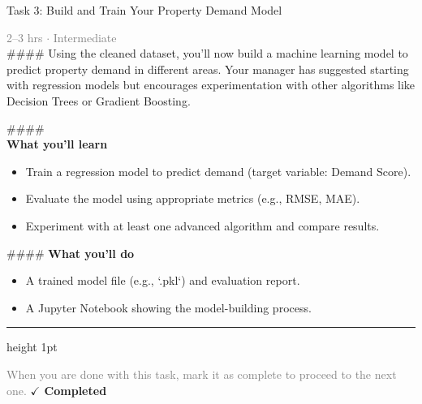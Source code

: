 \documentclass[10pt,a4paper]{article}
\begin{document}
\begin{taskbox}{Task 3: Build and Train Your Property Demand Model}

    {\small \textcolor{gray}{2--3 hrs $\cdot$ Intermediate}}\\[12pt]

    \#\#\#\# 
Using the cleaned dataset, you’ll now build a machine learning model to predict property demand in different areas. Your manager has suggested starting with regression models but encourages experimentation with other algorithms like Decision Trees or Gradient Boosting.

\#\#\#\# \\[10pt]
\vspace{8pt}
{\large \textbf{\textcolor{brandLight}{What you'll learn}}}\\[4pt]
\begin{itemize}
    \item Train a regression model to predict demand (target variable: Demand Score).
    \item Evaluate the model using appropriate metrics (e.g., RMSE, MAE).
    \item Experiment with at least one advanced algorithm and compare results.
\end{itemize}

\#\#\#\# \vspace{8pt}
{\large \textbf{\textcolor{brandLight}{What you'll do}}}\\[4pt]
\begin{itemize}
    \item A trained model file (e.g., `.pkl`) and evaluation report.
    \item A Jupyter Notebook showing the model-building process.\par
\end{itemize}

    \vspace{16pt}

    \textcolor{cardBorder}{\hrule height 1pt}\vspace{8pt}

    \small \textcolor{gray}{When you are done with this task, mark it as complete to proceed to the next one.} \hfill \textbf{\textcolor{brandDark}{$\checkmark$ Completed}}

\end{taskbox}
\end{document}
